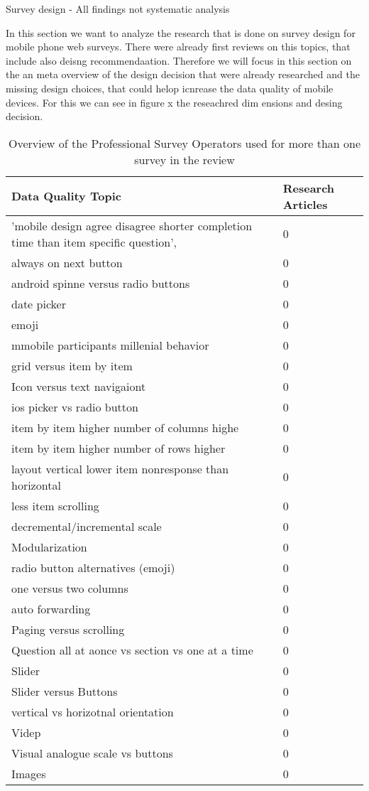 Survey design
- All findings not systematic analysis

In this section we want to analyze the research that is done on survey design for mobile phone web surveys. There were already first reviews on this topics, that include also deisng recommendaation. Therefore we will focus in this section on the an meta overview of the design decision that were already researched and the missing design choices, that could helop icnrease the data quality of mobile devices. For this we can see in figure x the reseachred dim ensions and desing decision.


\begin{table}
	\centering
	\begin{tabular}{ll}
		\toprule
		Data Quality Topic  &  Research Articles \\
		\midrule
         'mobile design agree disagree shorter completion time than item specific question',   & 0  \\
         always on next button   & 0  \\
        android spinne versus radio buttons   & 0  \\
        date picker    & 0  \\
        emoji    & 0  \\
        mmobile participants millenial behavior    & 0  \\
        grid versus item by item    & 0  \\
        Icon versus text navigaiont & 0 \\
        ios picker vs radio button    & 0  \\
        item by item higher number of columns highe    & 0  \\
        item by item higher number of rows higher    & 0  \\
        layout vertical lower item nonresponse than horizontal    & 0  \\
        less item scrolling   & 0  \\
        decremental/incremental scale    & 0  \\
        Modularization    & 0  \\
        radio button alternatives (emoji)    & 0  \\
        one versus two columns    & 0  \\
        auto forwarding    & 0  \\
        Paging versus scrolling    & 0  \\
        Question all at aonce vs section vs one at a time & 0 \\
        Slider & 0 \\
        Slider versus Buttons  & 0 \\
        vertical vs horizotnal orientation &0 \\
        Videp & 0  \\
        Visual analogue scale vs buttons & 0 \\
        Images & 0 \\
		\bottomrule 
	\end{tabular}
	\caption{Overview of the Professional Survey Operators used for more than one survey in the review}
	\label{tab: author}
\end{table}

